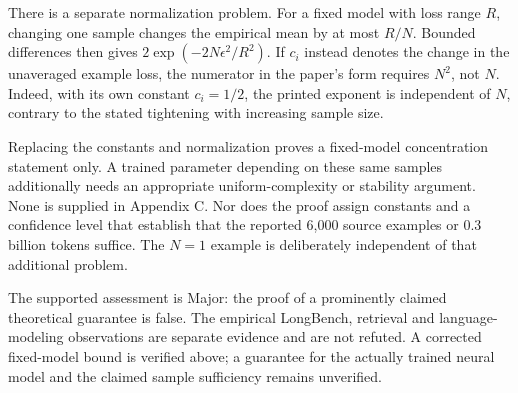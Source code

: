 \documentclass[10pt]{article}
\begin{document}
There is a separate normalization problem. For a fixed model with loss range \(R\), changing one sample changes the empirical mean by at most \(R/N\). Bounded differences then gives \(2\exp(-2N\epsilon^2/R^2)\). If \(c_i\) instead denotes the change in the unaveraged example loss, the numerator in the paper’s form requires \(N^2\), not \(N\). Indeed, with its own constant \(c_i=1/2\), the printed exponent is independent of \(N\), contrary to the stated tightening with increasing sample size.\par
Replacing the constants and normalization proves a fixed-model concentration statement only. A trained parameter depending on these same samples additionally needs an appropriate uniform-complexity or stability argument. None is supplied in Appendix C. Nor does the proof assign constants and a confidence level that establish that the reported 6,000 source examples or 0.3 billion tokens suffice. The \(N=1\) example is deliberately independent of that additional problem.\par
The supported assessment is Major: the proof of a prominently claimed theoretical guarantee is false. The empirical LongBench, retrieval and language-modeling observations are separate evidence and are not refuted. A corrected fixed-model bound is verified above; a guarantee for the actually trained neural model and the claimed sample sufficiency remains unverified.\par
\end{document}
